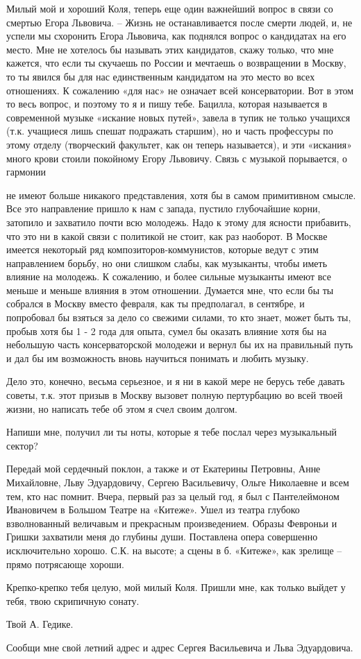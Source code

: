 
Милый мой и хороший Коля, теперь еще один важнейший вопрос в связи со смертью
Егора Львовича. -- Жизнь не останавливается после смерти людей, и, не успели мы
схоронить Егора Львовича, как поднялся вопрос о кандидатах на его место. Мне не
хотелось бы называть этих кандидатов, скажу только, что мне кажется, что если
ты скучаешь по России и мечтаешь о возвращении в Москву, то ты явился бы для
нас единственным кандидатом на это место во всех отношениях. К сожалению «для
нас» не означает всей консерватории. Вот в этом то весь вопрос, и поэтому то я
и пишу тебе. Бацилла, которая называется в современной музыке «искание новых
путей», завела в тупик не только учащихся (т.к. учащиеся лишь спешат подражать
старшим), но и часть профессуры по этому отделу (творческий факультет, как он
теперь называется), и эти «искания» много крови стоили покойному Егору
Львовичу. Связь с музыкой порывается, о гармонии


\noindent
не имеют больше никакого представления, хотя бы в самом примитивном смысле. Все
это направление пришло к нам с запада, пустило глубочайшие корни, затопило и
захватило почти всю молодежь. Надо к этому для ясности прибавить, что это ни в
какой связи с политикой не стоит, как раз наоборот. В Москве имеется некоторый
ряд композиторов-коммунистов, которые ведут с этим направлением борьбу, но они
слишком слабы, как музыканты, чтобы иметь влияние на молодежь. К сожалению, и
более сильные музыканты имеют все меньше и меньше влияния в этом отношении.
Думается мне, что если бы ты собрался в Москву вместо февраля, как ты
предполагал, в сентябре, и попробовал бы взяться за дело со свежими силами, то
кто знает, может быть ты, пробыв хотя бы 1 - 2 года для опыта, сумел бы оказать
влияние хотя бы на небольшую часть консерваторской молодежи и вернул бы их на
правильный путь и дал бы им возможность вновь научиться понимать и любить
музыку.


\noindent
Дело это, конечно, весьма серьезное, и я ни в какой мере не берусь тебе давать
советы, т.к. этот призыв в Москву вызовет полную пертурбацию во всей твоей
жизни, но написать тебе об этом я счел своим долгом.

Напиши мне, получил ли ты ноты, которые я тебе послал через музыкальный сектор?

Передай мой сердечный поклон, а также и от Екатерины Петровны, Анне Михайловне,
Льву Эдуардовичу, Сергею Васильевичу, Ольге Николаевне и всем тем, кто нас
помнит. Вчера, первый раз за целый год, я был с Пантелеймоном Ивановичем в
Большом Театре на «Китеже». Ушел из театра глубоко взволнованный величавым и
прекрасным произведением. Образы Февроньи и Гришки захватили меня до глубины
души. Поставлена опера совершенно исключительно хорошо. С.К. на высоте; а сцены
в б.  «Китеже», как зрелище -- прямо потрясающе хороши.

Крепко-крепко тебя целую, мой милый Коля. Пришли мне, как только выйдет у тебя,
твою скрипичную сонату.

Твой А. Гедике.


Сообщи мне свой летний адрес и адрес Сергея Васильевича и Льва Эдуардовича.
